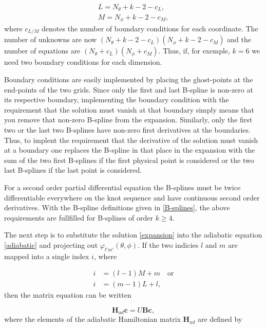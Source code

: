 \begin{align}
L = N_{\theta}+k-2-c_L,\\
M = N_{\phi}+k-2-c_M,
\end{align}
where $c_{L/M}$ denotes the number of boundary conditions for each coordinate. The number of unknowns are now $(N_{\theta}+k-2-c_L)(N_{\phi}+k-2-c_M)$ and the number of equations are $(N_{\theta}+c_L)(N_{\phi}+c_M)$. Thus, if, for exemple, $k=6$ we need two boundary conditions for each dimension. 

Boundary conditions are easily implemented by placing the ghost-points at the end-points of the two grids. Since only the first and last B-spline is non-zero at its respective boundary, implementing the boundary condition with the requirement that the solution must vanish at that boundary simply means that you remove that non-zero B-spline from the expansion. Similarly, only the first two or the last two B-splines have non-zero first derivatives at the boundaries. Thus, to implent the requirement that the derivative of the solution must vanish at a boundary one replaces the B-spline in that place in the expansion with the sum of the two first B-splines if the first physical point is considered or the two last B-splines if the last point is considered.

For a second order partial differential equation the B-splines must be twice differentiable everywhere on the knot sequence and have continuous second order derivatives. With the B-spline definitions given in \cref{B-splines}, the above requirements are fullfilled for B-splines of order $k\geq 4$. 

The next step is to substitute the solution \eqref{expansion} into the adiabatic equation \eqref{adiabatic} and projecting out $\varphi_{l'm'}(\theta,\phi)$. If the two indicies $l$ and $m$ are mapped into a single index $i$, where

\begin{equation}
\begin{aligned}
i &= (l-1)M+m \quad \text{or}\\
i &= (m-1)L+l,
\end{aligned}
\end{equation} 
then the matrix equation can be written

\begin{equation}\label{generalized}
\mathbf{H}_{ad}\mathbf{c} = U\mathbf{B}\mathbf{c},
\end{equation}
where the elements of the adiabatic Hamiltonian matrix $\mathbf{H}_{ad}$ are defined by

